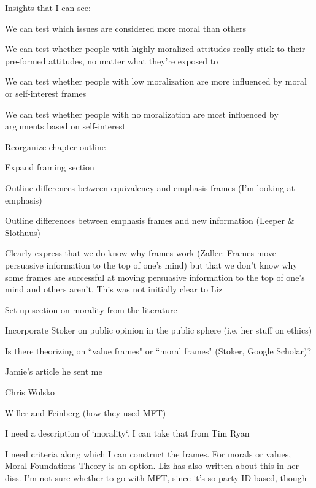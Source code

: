 \documentclass[12pt]{article}
\begin{document}
\begin{coi}
\begin{coi}
				\item Insights that I can see:
					\begin{coi}
						\item We can test which issues are considered more moral than others 
						\item We can test whether people with highly moralized attitudes really stick to their pre-formed attitudes, no matter what they're exposed to 
						\item We can test whether people with low moralization are more influenced by moral or self-interest frames 
						\item We can test whether people with no moralization are most influenced by arguments based on self-interest 
					\end{coi}
			\end{coi}
		\item Reorganize chapter outline
		\item Expand framing section
			\begin{coi}
				\item Outline differences between equivalency and emphasis frames (I'm looking at emphasis)
				\item Outline differences between emphasis frames and new information (Leeper \& Slothuus)
				\item Clearly express that we do know why frames work (Zaller: Frames move persuasive information to the top of one's mind) but that we don't know why some frames are successful at moving persuasive information to the top of one's mind and others aren't. This was not initially clear to Liz
			\end{coi}
		\item Set up section on morality from the literature
			\begin{coi}
				\item Incorporate Stoker on public opinion in the public sphere (i.e. her stuff on ethics)
				\item Is there theorizing on ``value frames" or ``moral frames" (Stoker, Google Scholar)?
				\item Jamie's article he sent me
				\item Chris Wolsko
				\item Willer and Feinberg (how they used MFT)
				\item I need a description of `morality`. I can take that from Tim Ryan
				\item I need criteria along which I can construct the frames. For morals or values, Moral Foundations Theory is an option. Liz has also written about this in her diss. I'm not sure whether to go with MFT, since it's so party-ID based, though

\end{coi}
\end{coi}
\end{document}
